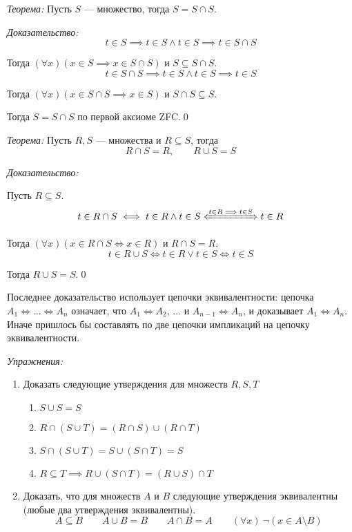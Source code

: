 {\it Теорема:} Пусть $S$ --- множество, тогда $S=S\cap S$.

	{\it Доказательство:}
\[
	t\in S\implies t\in S\land t\in S\implies t\in S\cap S
\]

Тогда $(\forall x)(x\in S\implies x\in S\cap S)$ и $S\subseteq S\cap S$.
\[
	t\in S\cap S\implies t\in S\land t\in S\implies t\in S
\]

Тогда $(\forall x)(x\in S\cap S\implies x\in S)$ и $S\cap S\subseteq S$.

Тогда $S=S\cap S$ по первой аксиоме ZFC.\qed

\vspace{1em}
{\it Теорема:} Пусть $R,S$ --- множества и $R\subseteq S$, тогда
\[
	R\cap S= R,\qquad R\cup S= S
\]

{\it Доказательство:}

Пусть $R\subseteq S$.
\[
	t\in R\cap S\iff t\in R\land t\in S\xLeftrightarrow{t\in R\implies t\in S} t\in R
\]

Тогда $(\forall x)(x\in R\cap S\iff x\in R)$ и $R\cap S=R$.
\[
	t\in R\cup S\iff t\in R\lor t\in S\iff t\in S
\]

Тогда $R\cup S=S$.\qed

Последнее доказательство использует цепочки эквивалентности:
цепочка $A_1\iff...\iff A_{n}$ означает, что $A_1\iff A_2$, ... и
$A_{n-1}\iff A_{n}$, и доказывает $A_1\iff A_{n}$. Иначе пришлось
бы составлять по две цепочки импликаций на цепочку эквивалентности.

\pagebreak

\newcommand\eset{\varnothing}
{\it Упражнения:}
\begin{enumerate}
	\item{}Доказать следующие утверждения для множеств $R,S,T$
	\begin{fullwidth}
		\begin{multicols}{2}
			\begin{enumerate}
				\item{}$S\cup S=S$
				\item{}$R\cap (S\cup T)=(R\cap S)\cup (R\cap T)$
				\item{}$S\cap (S\cup T)=S\cup (S\cap T)=S$
				\item{}$R\subseteq T\implies R\cup (S\cap T)=(R\cup S)\cap T$
			\end{enumerate}
		\end{multicols}
	\end{fullwidth}

	\item{}Доказать, что для множеств $A$ и $B$ следующие утверждения эквивалентны
	(любые два утверждения эквивалентны).
	\[
		A\subseteq B\qquad A\cup B=B\qquad A\cap B=A
		\qquad (\forall x)~\lnot(x\in A\setminus B)
	\]
\end{enumerate}


